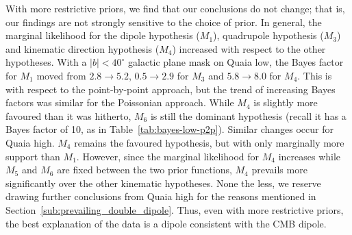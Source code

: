 \documentclass[fleqn,usenatbib]{mnras}
\begin{document}
        With more restrictive priors, we find that our conclusions do not change; that is, our findings are not strongly sensitive to the choice of prior.
        In general, the marginal likelihood for the dipole hypothesis ($M_1$), quadrupole hypothesis ($M_3$) and kinematic direction hypothesis ($M_4$) increased with respect to the other hypotheses.
        With a $|b| < 40^\circ$ galactic plane mask on Quaia low, the Bayes factor for $M_1$ moved from $2.8 \to 5.2$, $0.5 \to 2.9$ for $M_3$ and $5.8 \to 8.0$ for $M_4$.
        This is with respect to the point-by-point approach, but the trend of increasing Bayes factors was similar for the Poissonian approach.
        While $M_4$ is slightly more favoured than it was hitherto, $M_6$ is still the dominant hypothesis (recall it has a Bayes factor of 10, as in Table~\ref{tab:bayes-low-p2p}).
        Similar changes occur for Quaia high.
        $M_4$ remains the favoured hypothesis, but with only marginally more support than $M_1$.
        However, since the marginal likelihood for $M_4$ increases while $M_5$ and $M_6$ are fixed between the two prior functions, $M_4$ prevails more significantly over the other kinematic hypotheses.
        None the less, we reserve drawing further conclusions from Quaia high for the reasons mentioned in Section~\ref{sub:prevailing_double_dipole}.
        Thus, even with more restrictive priors, the best explanation of the data is a dipole consistent with the CMB dipole.
    
\end{document}
